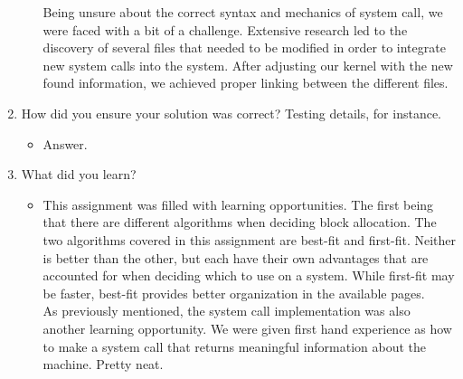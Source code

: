 \documentclass[letterpaper,10pt,onecolumn]{IEEEtran}
\newcommand\tab[1][1cm]{\hspace*{#1}}
\begin{document}
\begin{enumerate}
\begin{itemize}
            \tab Being unsure about the correct syntax and mechanics of system call, we were faced with a bit of a challenge. Extensive research led to the discovery of several files that needed to be modified in order to integrate new system calls into the system. After adjusting our kernel with the new found information, we achieved proper linking between the different files.
        \end{itemize}
        \item How did you ensure your solution was correct? Testing details, for instance.
        \begin{itemize}
            \item Answer.
        \end{itemize}
        \item What did you learn?
        \begin{itemize}
            \item \tab This assignment was filled with learning opportunities. The first being that there are different algorithms when deciding block allocation. The two algorithms covered in this assignment are best-fit and first-fit. Neither is better than the other, but each have their own advantages that are accounted for when deciding which to use on a system. While first-fit may be faster, best-fit provides better organization in the available pages.\\
            \tab As previously mentioned, the system call implementation was also another learning opportunity. We were given first hand experience as how to make a system call that returns meaningful information about the machine. Pretty neat.
        \end{itemize}
    \end{enumerate}
    
    
\end{document}
